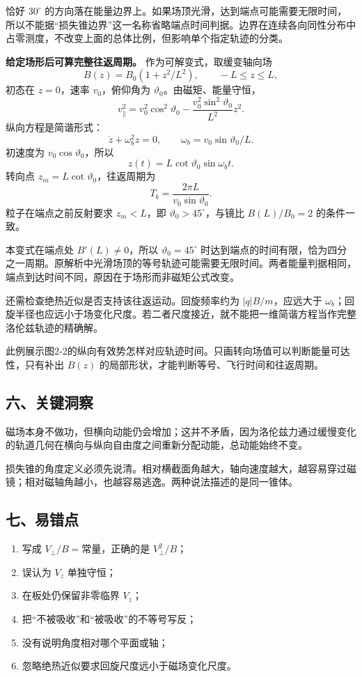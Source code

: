 \documentclass[12pt,a4paper,UTF8]{ctexart}
\newcommand{\tightlist}{\setlength{\itemsep}{0pt}\setlength{\parskip}{0pt}}
\begin{document}
恰好 \(30^\circ\)
的方向落在能量边界上。如果场顶光滑，达到端点可能需要无限时间，所以不能据``损失锥边界''这一名称省略端点时间判据。边界在连续各向同性分布中占零测度，不改变上面的总体比例，但影响单个指定轨迹的分类。

\textbf{给定场形后可算完整往返周期。} 作为可解变式，取缓变轴向场 \[
B(z)=B_0(1+z^2/L^2),\qquad -L\le z\le L,
\] 初态在 \(z=0\)，速率 \(v_0\)，俯仰角为
\(\vartheta_0\)。由磁矩、能量守恒， \[
v_\parallel^2=v_0^2\cos^2\vartheta_0-
\frac{v_0^2\sin^2\vartheta_0}{L^2}z^2.
\] 纵向方程是简谐形式： \[
\ddot z+\omega_b^2z=0,
\qquad\omega_b=v_0\sin\vartheta_0/L.
\] 初速度为 \(v_0\cos\vartheta_0\)，所以 \[
z(t)=L\cot\vartheta_0\sin\omega_bt.
\] 转向点 \(z_m=L\cot\vartheta_0\)，往返周期为 \[
T_b=\frac{2\pi L}{v_0\sin\vartheta_0}.
\] 粒子在端点之前反射要求 \(z_m<L\)，即 \(\vartheta_0>45^\circ\)，与镜比
\(B(L)/B_0=2\) 的条件一致。

本变式在端点处 \(B'(L)\ne0\)，所以 \(\vartheta_0=45^\circ\)
时达到端点的时间有限，恰为四分之一周期。原解析中光滑场顶的等号轨迹可能需要无限时间。两者能量判据相同，端点到达时间不同，原因在于场形而非磁矩公式改变。

还需检查绝热近似是否支持该往返运动。回旋频率约为 \(|q|B/m\)，应远大于
\(\omega_b\)；回旋半径也应远小于场变化尺度。若二者尺度接近，就不能把一维简谐方程当作完整洛伦兹轨迹的精确解。

此例展示图2-2的纵向有效势怎样对应轨迹时间。只画转向场值可以判断能量可达性，只有补出
\(B(z)\) 的局部形状，才能判断等号、飞行时间和往返周期。

\subsection{六、关键洞察}\label{ux516dux5173ux952eux6d1eux5bdf-1}

磁场本身不做功，但横向动能仍会增加；这并不矛盾，因为洛伦兹力通过缓慢变化的轨道几何在横向与纵向自由度之间重新分配动能，总动能始终不变。

损失锥的角度定义必须先说清。相对横截面角越大，轴向速度越大，越容易穿过磁镜；相对磁轴角越小，也越容易逃逸。两种说法描述的是同一锥体。

\subsection{七、易错点}\label{ux4e03ux6613ux9519ux70b9-1}

\begin{enumerate}
\def\labelenumi{\arabic{enumi}.}
\tightlist
\item
  写成 \(V_\perp/B=\text{常量}\)，正确的是 \(V_\perp^2/B\)；
\item
  误认为 \(V_z\) 单独守恒；
\item
  在板处仍保留非零临界 \(V_z\)；
\item
  把``不被吸收''和``被吸收''的不等号写反；
\item
  没有说明角度相对哪个平面或轴；
\item
  忽略绝热近似要求回旋尺度远小于磁场变化尺度。
\end{enumerate}
\end{document}
